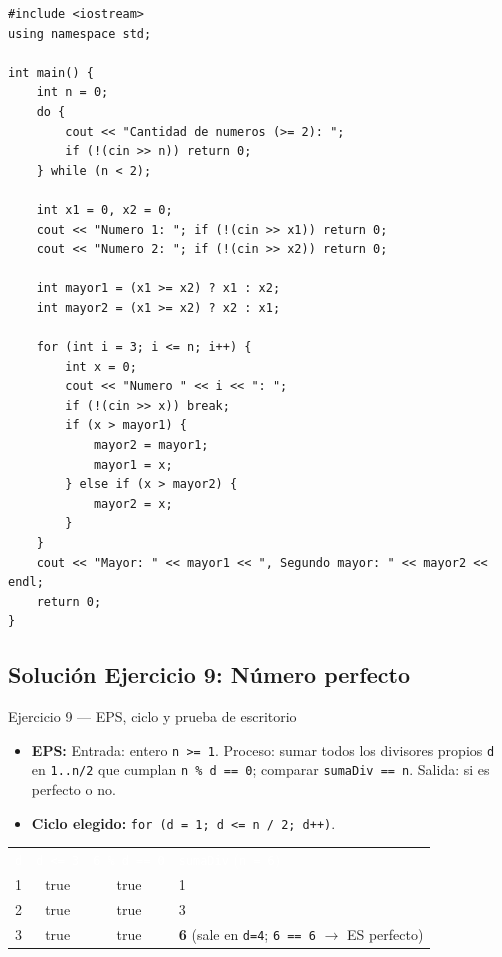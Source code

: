 \documentclass[11pt,letterpaper]{article}
\begin{document}
\begin{lstlisting}[style=cppmonitoria,caption={Solución Ejercicio 8: Mayor y segundo mayor sin arreglos (C++)}]
#include <iostream>
using namespace std;

int main() {
    int n = 0;
    do {
        cout << "Cantidad de numeros (>= 2): ";
        if (!(cin >> n)) return 0;
    } while (n < 2);

    int x1 = 0, x2 = 0;
    cout << "Numero 1: "; if (!(cin >> x1)) return 0;
    cout << "Numero 2: "; if (!(cin >> x2)) return 0;

    int mayor1 = (x1 >= x2) ? x1 : x2;
    int mayor2 = (x1 >= x2) ? x2 : x1;

    for (int i = 3; i <= n; i++) {
        int x = 0;
        cout << "Numero " << i << ": ";
        if (!(cin >> x)) break;
        if (x > mayor1) {
            mayor2 = mayor1;
            mayor1 = x;
        } else if (x > mayor2) {
            mayor2 = x;
        }
    }
    cout << "Mayor: " << mayor1 << ", Segundo mayor: " << mayor2 << endl;
    return 0;
}
\end{lstlisting}

\subsection{Solución Ejercicio 9: Número perfecto}

\begin{solucion}{Ejercicio 9 --- EPS, ciclo y prueba de escritorio}
\begin{itemize}
  \item \textbf{EPS:} Entrada: entero \texttt{n >= 1}. Proceso: sumar todos los divisores propios \texttt{d} en \texttt{1..n/2} que cumplan \texttt{n \% d == 0}; comparar \texttt{sumaDiv == n}. Salida: si es perfecto o no.
  \item \textbf{Ciclo elegido:} \texttt{for (d = 1; d <= n / 2; d++)}.
\end{itemize}
\begin{center}
\footnotesize
\renewcommand{\arraystretch}{1.15}
\begin{tabularx}{0.85\linewidth}{c c c X}
\rowcolor{AzulMarino}
\textcolor{white}{\texttt{d}} & \textcolor{white}{\texttt{d <= 3}} & \textcolor{white}{\texttt{6 \% d == 0}} & \textcolor{white}{\texttt{sumaDiv} (\texttt{n = 6})} \\
1 & true & true & 1 \\
2 & true & true & 3 \\
3 & true & true & \textbf{6} (sale en \texttt{d=4}; \texttt{6 == 6} $\rightarrow$ ES perfecto) \\
\bottomrule
\end{tabularx}
\end{center}
\end{solucion}
\end{document}
